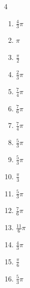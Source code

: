 \begin{multicols}{4}
\begin{enumerate}
  \item $\displaystyle \frac{4}{3}\pi$

  \item $\displaystyle \pi$

  \item $\displaystyle \frac{\pi}{2}$

  \item $\displaystyle \frac{2}{3}\pi$

  \item $\displaystyle \frac{7}{4}\pi$

  \item $\displaystyle \frac{7}{6}\pi$

  \item $\displaystyle \frac{7}{4}\pi$

  \item $\displaystyle \frac{5}{3}\pi$

  \item $\displaystyle \frac{5}{3}\pi$

  \item $\displaystyle \frac{\pi}{3}$

  \item $\displaystyle \frac{5}{3}\pi$

  \item $\displaystyle \frac{7}{6}\pi$

  \item $\displaystyle \frac{11}{6}\pi$

  \item $\displaystyle \frac{4}{3}\pi$

  \item $\displaystyle \frac{\pi}{6}$

  \item $\displaystyle \frac{5}{3}\pi$


\end{enumerate}
\end{multicols}
